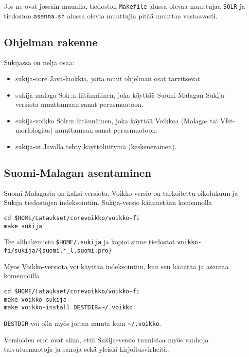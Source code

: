 \documentclass[12pt]{article}
\begin{document}
Jos ne ovat jossain muualla, tiedoston \verb=Makefile= alussa olevaa
muuttujaa \verb=SOLR= ja tiedoston \verb=asenna.sh= alussa olevia
muuttujia pitää muuttaa vastaavasti.


\newpage
\subsection*{Ohjelman rakenne}

Sukijassa on neljä osaa:

\begin{itemize}
\item sukija-core     Java-luokkia, joita muut ohjelman osat tarvitsevat.
\item sukija-malaga   Solr:n liitännäinen, joka käyttää Suomi-Malagan
                      Sukija-versiota muuttamaan sanat perusmuotoon.
\item sukija-voikko   Solr:n liitännäinen, joka käyttää Voikkoa
                      (Malaga- tai Vfst-morfologiaa) muuttamaan sanat perusmuotoon.
\item sukija-ui       Javalla tehty käyttöliittymä (keskeneräinen).
\end{itemize}


\subsection*{Suomi-Malagan asentaminen}

Suomi-Malagasta on kaksi versiota, Voikko-versio on tarkoitettu
oikolukuun ja Sukija tiedostojen indeksointiin. Sukija-versio
käännetään komennolla

\begin{verbatim}
cd $HOME/Lataukset/corevoikko/voikko-fi
make sukija
\end{verbatim}

Tee alihakemisto \verb=$HOME/.sukija= ja kopioi sinne tiedostot
\verb=voikko-fi/sukija/{suomi.*_l,suomi.pro}=

Myös Voikko-versiota voi käyttää indeksointiin, kun sen kääntää ja
asentaa komennoilla

\begin{verbatim}
cd $HOME/Lataukset/corevoikko/voikko-fi
make voikko-sukija
make voikko-install DESTDIR=~/.voikko
\end{verbatim}

\verb|DESTDIR| voi olla myös joitan muuta kuin \verb|~/.voikko|.

Versioiden erot ovat siinä, että Sukija-versio tunnistaa myös vanhoja
taivutusmuotoja ja sanoja sekä yleisiä kirjoitusvirheitä.
\end{document}
